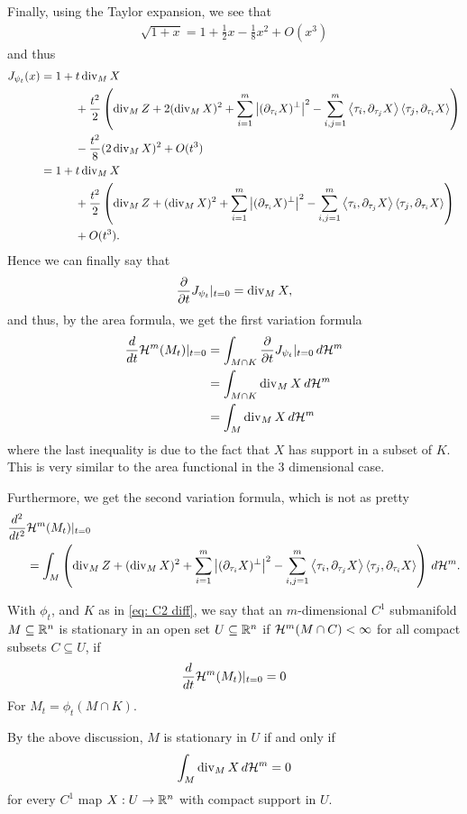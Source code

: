 Finally, using the Taylor expansion, we see that
\begin{align*}
    \sqrt{1+x} = 1 + \frac{1}{2}x - \frac{1}{8}x^2 + O(x^3)
\end{align*}
and thus
\begin{align*}
    J_{\psi_t}(x) &= 1 + t \operatorname{div}_M X  \\
    & \qquad \quad + \frac{t^2}{2}\left( \operatorname{div}_M Z + 2(\operatorname{div}_M X)^2 +  \sum_{i=1}^m\left| (\partial_{\tau_i}X)^{\perp} \right|^2 - \sum_{i,j=1}^m\left\langle\tau_i, \partial_{\tau_j}X\right\rangle\left\langle\tau_j, \partial_{\tau_i}X\right\rangle\right) \\
    &\qquad\quad - \frac{t^2}{8}(2\operatorname{div}_M X)^2 + O(t^3) \\
    &= 1 + t \operatorname{div}_M X \\
    & \qquad\quad + \frac{t^2}{2}\left( \operatorname{div}_M Z + (\operatorname{div}_M X)^2 +  \sum_{i=1}^m\left| (\partial_{\tau_i}X)^{\perp} \right|^2 - \sum_{i,j=1}^m\left\langle\tau_i, \partial_{\tau_j}X\right\rangle\left\langle\tau_j, \partial_{\tau_i}X\right\rangle\right) \\ &\qquad\quad + O(t^3).
\end{align*}
Hence we can finally say that
\begin{align*}
    \frac{\partial}{\partial t}J_{\psi_t}|_{t=0} = \operatorname{div}_M X,
\end{align*}
and thus, by the area formula, we get the first variation formula
\begin{align*}
    \frac{d}{dt}\mathcal{H}^m(M_t)|_{t=0} &= \int_{M \cap K} \frac{\partial}{\partial t}J_{\psi_t}|_{t=0} \, d\mathcal{H}^m \\
    &= \int_{M \cap K} \operatorname{div}_M X \, d\mathcal{H}^m \\
    &= \int_{M} \operatorname{div}_M X \, d\mathcal{H}^m \\
\end{align*}
where the last inequality is due to the fact that $X$ has support in a subset of $K$. This is very similar to the area functional in the 3 dimensional case.

Furthermore, we get the second variation formula, which is not as pretty
\begin{align*}
    \frac{d^2}{dt^2} &\mathcal{H}^m(M_t)|_{t=0} \\
    &= \int_M \left( \operatorname{div}_M Z + (\operatorname{div}_M X)^2 +  \sum_{i=1}^m\left| (\partial_{\tau_i}X)^{\perp} \right|^2 - \sum_{i,j=1}^m\left\langle\tau_i, \partial_{\tau_j}X\right\rangle\left\langle\tau_j, \partial_{\tau_i}X\right\rangle\right) \, d\mathcal{H}^m.
\end{align*}

\begin{definition}
With $\phi_t$, and $K$ as in \eqref{eq: C2 diff}, we say that an $m$-dimensional $C^1$ submanifold $M \subseteq \mathbb{R}^n$ is stationary in an open set $U \subseteq \mathbb{R}^n$ if $\mathcal{H}^m(M \cap C) < \infty$ for all compact subsets $C \subseteq U$, if
\begin{align*}
    \frac{d}{dt}\mathcal{H}^m(M_t)|_{t=0} = 0
\end{align*}
For $M_t = \phi_t(M \cap K)$.
\end{definition}
By the above discussion, $M$ is stationary in $U$ if and only if
\begin{align*}
    \int_{M} \operatorname{div}_M X \, d\mathcal{H}^m = 0
\end{align*}
for every $C^1$ map $X:U \to \mathbb{R}^n$ with compact support in $U$.

